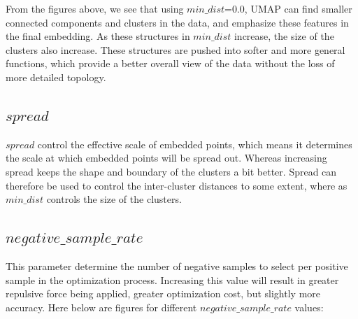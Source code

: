 
\noindent From the figures above, we see that using $min\_dist$=0.0, UMAP can find smaller connected components and clusters in the data, and emphasize these features in the final embedding. As these structures in $min\_dist$ increase, the size of the clusters also increase. These structures are pushed into softer and more general functions, which provide a better overall view of the data without the loss of more detailed topology. 

\subsection{$spread$}

$spread$ control the effective scale of embedded points, which means it determines the scale at which embedded points will be spread out. Whereas increasing spread keeps the shape and boundary of the clusters a bit better. Spread can therefore be used to control the inter-cluster distances to some extent, where as $min\_dist$ controls the size of the clusters.

\subsection{$negative\_sample\_rate$}

This parameter determine the number of negative samples to select per positive sample in the optimization process. Increasing this value will result in greater repulsive force being applied, greater optimization cost, but slightly more accuracy. Here below are figures for different $negative\_sample\_rate$ values:

